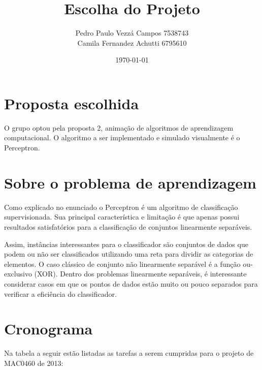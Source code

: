 \documentclass[brazil, a4paper]{article}
\begin{document}
\title{Escolha do Projeto}
\author{Pedro Paulo Vezzá Campos \hfill 7538743\\
		Camila Fernandez Achutti \hfill 6795610}
\date{\today}

\maketitle



\section{Proposta escolhida}
O grupo optou pela proposta 2, animação de algoritmos de aprendizagem
computacional. O algoritmo a ser implementado e simulado visualmente é o
Perceptron.

\section{Sobre o problema de aprendizagem}
Como explicado no enunciado o Perceptron é um algoritmo de classificação 
supervisionada. Sua principal característica e limitação é que apenas possui 
resultados satisfatórios para a classificação de conjuntos linearmente
separáveis.

Assim, instâncias interessantes para o classificador são conjuntos de dados que
podem ou não ser classificados utilizando uma reta para dividir as categorias
de elementos. O caso clássico de conjunto não linearmente separável é a
função ou-exclusivo (XOR). Dentro dos problemas linearmente separáveis,
é interessante considerar casos em que os pontos de dados estão muito ou
pouco separados para verificar a eficiência do classificador.

\section{Cronograma}
Na tabela a seguir estão listadas as tarefas a serem cumpridas para o projeto
de MAC0460 de 2013:
\end{document}
